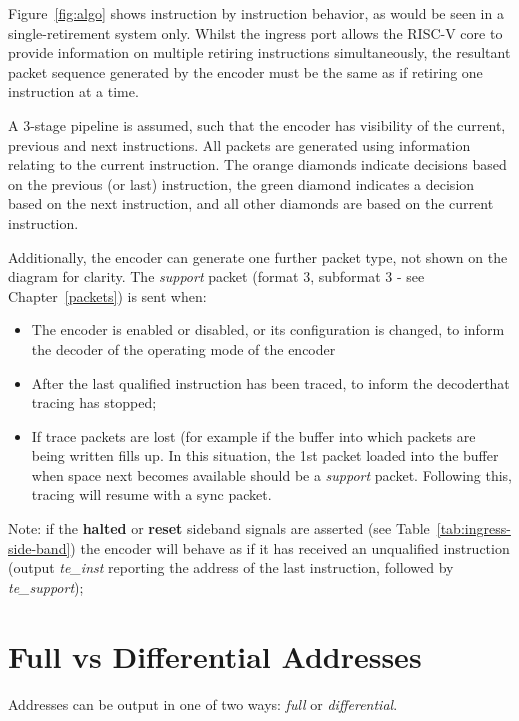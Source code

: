Figure~\ref{fig:algo} shows instruction by instruction behavior, as would be
seen in a single-retirement system only.  Whilst the ingress port allows the RISC-V core to
provide information on multiple retiring instructions simultaneously, the resultant packet
sequence generated by the encoder must be the same as if retiring one instruction at a time.

A 3-stage pipeline is assumed, such that the encoder has 
visibility of the current, previous and next instructions.  All packets are generated using 
information relating to the current instruction.  The orange diamonds indicate decisions 
based on the previous (or last) instruction, the green diamond indicates a decision based on the
next instruction, and all other diamonds are based on the current instruction.

Additionally, the encoder can generate one further packet type, not shown on the diagram for 
clarity.  The \textit{support} packet (format 3, subformat 3 - see Chapter~\ref{packets}) is 
sent when:

\begin{itemize}
  \item The encoder is enabled or disabled, or its configuration is changed, 
    to inform the decoder of the operating mode of the encoder
  \item After the last qualified instruction has been traced, to inform the decoderthat 
    tracing has stopped;
  \item If trace packets are lost (for example if the buffer into which packets are being 
    written fills up.  In this situation, the 1st packet 
    loaded into the buffer when space next becomes available should be a \textit{support} 
    packet.  Following this, tracing will resume with a sync packet.
\end{itemize}

Note: if the \textbf{halted} or \textbf{reset} sideband signals are asserted (see Table~\ref{tab:ingress-side-band})
the encoder will behave as if it has received an unqualified instruction (output \textit{te\_inst}
reporting the address of the last instruction, followed by \textit{te\_support});


\section{Full vs Differential Addresses} \label{addresses}
Addresses can be output in one of two ways: \textit{full} or \textit{differential}.

